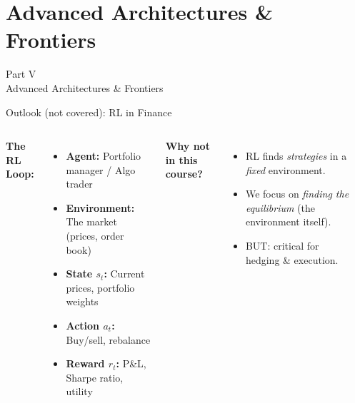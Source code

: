 \documentclass[aspectratio=169,11pt]{beamer}
\begin{document}
\section{Advanced Architectures \& Frontiers}

\begin{frame}{}
\begin{center}
{\Huge \textcolor{uzhblue}{Part V}}\\[0.8em]
{\LARGE Advanced Architectures \& Frontiers}
\end{center}
\end{frame}

\begin{frame}{Outlook (not covered): RL in Finance}
\small
\begin{columns}[T]
\textbf{The RL Loop:}
\begin{itemize}\itemsep1pt
    \item \textbf{Agent:} Portfolio manager / Algo trader
    \item \textbf{Environment:} The market (prices, order book)
    \item \textbf{State $s_t$:} Current prices, portfolio weights
    \item \textbf{Action $a_t$:} Buy/sell, rebalance
    \item \textbf{Reward $r_t$:} P\&L, Sharpe ratio, utility
\end{itemize}

\vspace{0.15cm}
\textbf{Why not in this course?}
\begin{itemize}\itemsep1pt
    \item RL finds \emph{strategies} in a \emph{fixed} environment.
    \item We focus on \emph{finding the equilibrium} (the environment itself).
    \item BUT: critical for hedging \& execution.
\end{itemize}

\begin{center}
\end{center}
\end{columns}
\end{frame}
\end{document}
